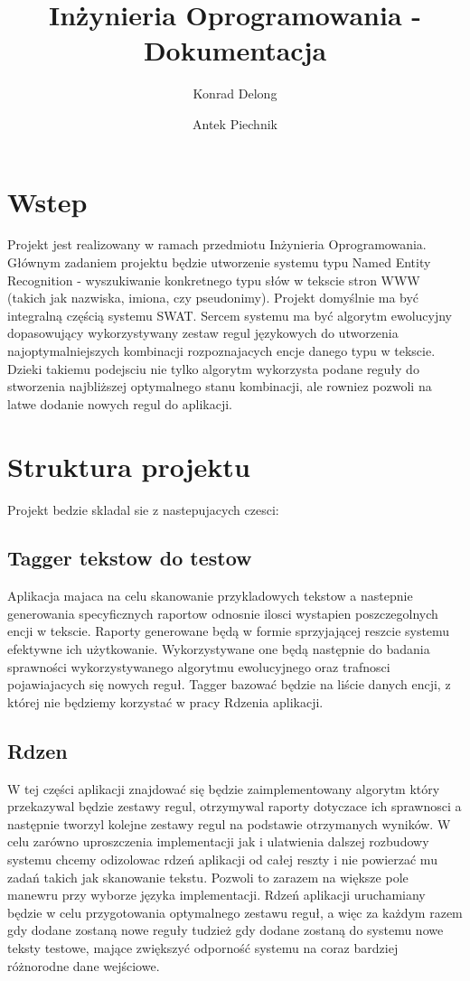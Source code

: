 \documentclass[12pt]{article}
\author{Konrad Delong \and Antek Piechnik}
\title{Inżynieria Oprogramowania - Dokumentacja}
\begin{document}
\maketitle
\tableofcontents
\newpage

\section{Wstep}
Projekt jest realizowany w ramach przedmiotu Inżynieria Oprogramowania. Głównym zadaniem projektu będzie utworzenie systemu typu Named Entity Recognition - wyszukiwanie konkretnego typu słów w tekscie stron WWW (takich jak nazwiska, imiona, czy pseudonimy). Projekt domyślnie ma być integralną częścią systemu SWAT. Sercem systemu ma być algorytm ewolucyjny dopasowujący wykorzystywany zestaw regul językowych do utworzenia najoptymalniejszych kombinacji rozpoznajacych encje danego typu w tekscie. Dzieki takiemu podejsciu nie tylko algorytm wykorzysta podane reguły do stworzenia najbliższej optymalnego stanu kombinacji, ale rowniez pozwoli na latwe dodanie nowych regul do aplikacji.
\section{Struktura projektu}
Projekt bedzie skladal sie z nastepujacych czesci:
\subsection{Tagger tekstow do testow}
Aplikacja majaca na celu skanowanie przykladowych tekstow a nastepnie generowania specyficznych raportow odnosnie ilosci wystapien poszczegolnych encji w tekscie. 
Raporty generowane będą w formie sprzyjającej reszcie systemu efektywne ich użytkowanie. Wykorzystywane one będą następnie do badania sprawności wykorzystywanego algorytmu ewolucyjnego oraz trafnosci pojawiajacych się nowych reguł. 
Tagger bazować będzie na liście danych encji, z której nie będziemy korzystać w pracy Rdzenia aplikacji.
\subsection{Rdzen}
W tej części aplikacji znajdować się będzie zaimplementowany algorytm który przekazywal będzie zestawy regul, otrzymywal raporty dotyczace ich sprawnosci a następnie tworzyl kolejne zestawy regul na podstawie otrzymanych wyników. 
W celu zarówno uproszczenia implementacji jak i ulatwienia dalszej rozbudowy systemu chcemy odizolowac rdzeń aplikacji od całej reszty i nie powierzać mu zadań takich jak skanowanie tekstu. Pozwoli to zarazem na większe pole manewru przy wyborze języka implementacji.
Rdzeń aplikacji uruchamiany będzie w celu przygotowania optymalnego zestawu reguł, a więc za każdym razem gdy dodane zostaną nowe reguły tudzież gdy dodane zostaną do systemu nowe teksty testowe, mające zwiększyć odporność systemu na coraz bardziej różnorodne dane wejściowe.
\end{document}
